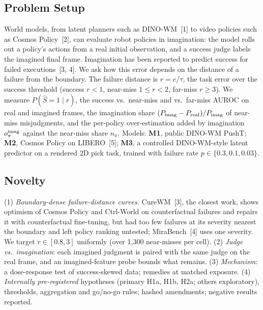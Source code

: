 \documentclass[nouppercase]{kaia}
\begin{document}
\begin{mdframed}
\subsection{Problem Setup}
World models, from latent planners such as DINO-WM~[1] to video policies such as Cosmos Policy~[2], can evaluate robot policies in imagination: the model rolls out a policy's actions from a real initial observation, and a success judge labels the imagined final frame. Imagination has been reported to predict success for failed executions~[3, 4]. We ask how this error depends on the distance of a failure from the boundary. The failure distance is $r=e/\tau$, the task error over the success threshold (success $r<1$, near-miss $1\le r<2$, far-miss $r\ge 3$). We measure $P(\hat S=1\mid r)$, the success vs.\ near-miss and vs.\ far-miss AUROC on real and imagined frames, the imagination share $(P_{\rm imag}-P_{\rm real})/P_{\rm imag}$ of near-miss misjudgments, and the per-policy over-estimation added by imagination $o^{\rm imag}_\pi$ against the near-miss share $n_\pi$. Models: \textbf{M1}, public DINO-WM PushT; \textbf{M2}, Cosmos Policy on LIBERO~[5]; \textbf{M3}, a controlled DINO-WM-style latent predictor on a rendered 2D pick task, trained with failure rate $p\in\{0.3, 0.1, 0.03\}$.

\subsection{Novelty}
(1) \textit{Boundary-dense failure-distance curves.} CureWM~[3], the closest work, shows optimism of Cosmos Policy and Ctrl-World on counterfactual failures and repairs it with counterfactual fine-tuning, but had too few failures at its severity nearest the boundary and left policy ranking untested; MiraBench~[4] uses one severity. We target $r\in[0.8,3]$ uniformly (over 1,300 near-misses per cell). (2) \textit{Judge vs.\ imagination}: each imagined judgment is paired with the same judge on the real frame, and an imagined-feature probe bounds what remains. (3) \textit{Mechanism}: a dose-response test of success-skewed data; remedies at matched exposure. (4) \textit{Internally pre-registered} hypotheses (primary H1a, H1b, H2a; others exploratory), thresholds, aggregation and go/no-go rules; hashed amendments; negative results reported.


\end{mdframed}
\end{document}
